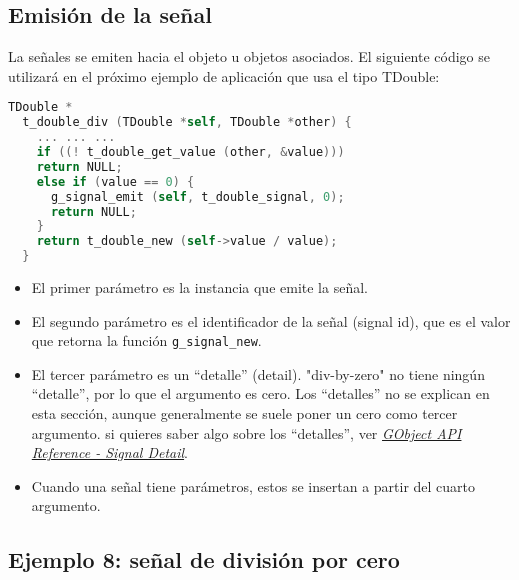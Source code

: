 \subsection{Emisión de la señal}
La señales se emiten hacia el objeto u objetos asociados. El siguiente código se utilizará en
el próximo ejemplo de aplicación que usa el tipo \textsf{TDouble}:
\begin{lstlisting}[language=C, numbers=none]
  TDouble *
  t_double_div (TDouble *self, TDouble *other) {
    ... ... ...
    if ((! t_double_get_value (other, &value)))
    return NULL;
    else if (value == 0) {
      g_signal_emit (self, t_double_signal, 0);
      return NULL;
    }
    return t_double_new (self->value / value);
  }
\end{lstlisting}

\begin{itemize}
  \tightlist
\item El primer parámetro es la instancia que emite la señal.
\item El segundo parámetro es el identificador de la señal (\textsf{signal id}), que es el valor que
  retorna la función \texttt{g\_signal\_new}.
\item El tercer parámetro es un ``detalle'' (\textsf{detail}). \textsf{"div-by-zero"} no tiene ningún ``detalle'',
  por lo que el argumento es cero. Los ``detalles'' no se explican en esta sección, aunque generalmente se
  suele poner un cero como tercer argumento. si quieres saber algo sobre los ``detalles'', ver
  \href{https://docs.gtk.org/gobject/concepts.html#the-detail-argument}
  {\emph{\textsf{GObject API Reference - Signal Detail}}}.
  \item Cuando una señal tiene parámetros, estos se insertan a partir del cuarto argumento.
  \end{itemize}

\subsection{Ejemplo 8: señal de división por cero}
